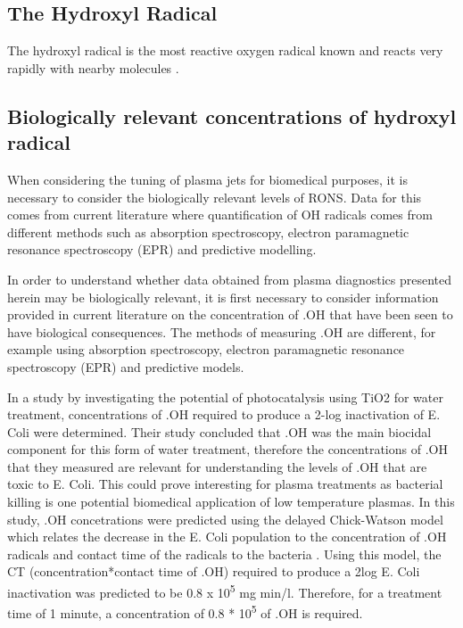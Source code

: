 \documentclass[11pt, oneside]{article}   	%
\begin{document}
\subsection{The Hydroxyl Radical}

The hydroxyl radical is the most reactive oxygen radical known and reacts very rapidly with nearby molecules \cite{Halliwell2007}.

\subsection{Biologically relevant concentrations of hydroxyl radical}

When considering the tuning of plasma jets for biomedical purposes, it is necessary to consider the biologically relevant levels of RONS.
Data for this comes from current literature where quantification of OH radicals comes from different methods such as absorption spectroscopy, electron paramagnetic resonance spectroscopy (EPR) and predictive modelling.

In order to understand whether data obtained from plasma diagnostics presented herein may be biologically relevant, it is first necessary to consider information provided in current literature on the concentration of .OH that have been seen to have biological consequences. The methods of measuring .OH are different, for example using absorption spectroscopy, electron paramagnetic resonance spectroscopy (EPR) and predictive models.

In a study by \cite{Cho2004} investigating the potential of photocatalysis using TiO2 for water treatment, concentrations of .OH required to produce a 2-log inactivation of E. Coli were determined. Their study concluded that .OH was the main biocidal component for this form of water treatment, therefore the concentrations of .OH that they measured are relevant for understanding the levels of .OH that are toxic to E. Coli. This could prove interesting for plasma treatments as bacterial killing is one potential biomedical application of low temperature plasmas. 
In this study, .OH concetrations were predicted using the delayed Chick-Watson model which relates the decrease in the E. Coli population to the concentration of .OH radicals and contact time of the radicals to the bacteria \cite{Cho2003}. Using this model, the CT (concentration*contact time of .OH) required to produce a 2log E. Coli inactivation was predicted to be 0.8 x 10\textsuperscript{5} mg min/l.  Therefore, for a treatment time of 1 minute, a concentration of 0.8 * 10\textsuperscript{5} of .OH is required. 
\end{document}
